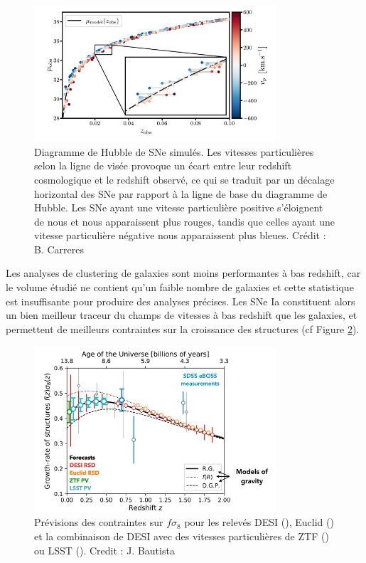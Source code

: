 \documentclass{book}
\begin{document}
\begin{figure}
    \centering
    \includegraphics[width=0.8\textwidth]{figures/Residues.png}
    \caption{Diagramme de Hubble de SNe simulés. Les vitesses particulières selon la ligne de visée provoque un écart entre leur redshift cosmologique et le redshift observé, ce qui se traduit par un décalage horizontal des SNe par rapport à la ligne de base du diagramme de Hubble. Les SNe ayant une vitesse particulière positive s'éloignent de nous et nous apparaissent plus rouges, tandis que celles ayant une vitesse particulière négative nous apparaissent plus bleues. Crédit : B. Carreres}
    \label{fig:residues}
\end{figure}

Les analyses de clustering de galaxies sont moins performantes à bas redshift, car le volume étudié ne contient qu'un faible nombre de galaxies et cette statistique est insuffisante pour produire des analyses précises. Les SNe Ia constituent alors un bien meilleur traceur du champs de vitesses à bas redshift que les galaxies, et permettent de meilleurs contraintes sur la croissance des structures (cf Figure \ref{fig:fs8}).

\begin{figure}
    \centering
    \includegraphics[width=0.8\textwidth]{figures/fs8.png}
    \caption{Prévisions des contraintes sur $f\sigma_8$ pour les relevés DESI (\cite{hahn_desi_2023}), Euclid (\cite{euclid_collaboration_euclid_2024}) et la combinaison de DESI avec des vitesses particulières de ZTF (\cite{carreres_growth-rate_2023}) ou LSST (\cite{howlett_2mtf_2017}). Credit : J. Bautista}
    \label{fig:fs8}
\end{figure}
\end{document}
